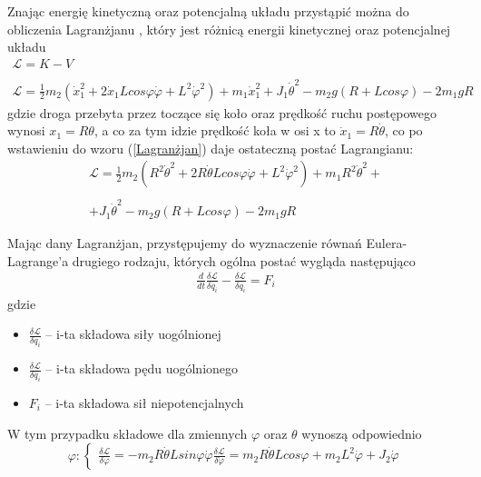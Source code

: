 Znając energię kinetyczną oraz potencjalną układu przystąpić można do obliczenia Lagranżjanu \cite{ManipulatoryiRoboty}, który jest różnicą energii kinetycznej oraz potencjalnej układu
\begin{equation}
    \begin{array}{cl}
    \mathcal{L} = K - V \\ \\ 
    \mathcal{L} = \frac{1}{2}m_2(\dot{x}_1^2 + 2\dot{x}_1Lcos\varphi\dot{\varphi} + L^2\dot{\varphi}^2) + m_1\dot{x}_1^2 + J_1\dot{\theta}^2 - m_2g(R + Lcos\varphi) - 2m_1gR
    \label{Lagranżjan}
    \end{array}
\end{equation}
gdzie droga przebyta przez toczące się koło oraz prędkość ruchu postępowego wynosi $x_1 = R\theta$, a co za tym idzie prędkość koła w osi x to $\dot{x}_1 = R\dot{\theta}$, co po wstawieniu do wzoru (\ref{Lagranżjan}) daje ostateczną postać Lagrangianu:
\begin{equation}
    \begin{array}{ll}
    \mathcal{L} = \frac{1}{2}m_2(R^2\dot{\theta}^2 + 2R\dot{\theta}Lcos\varphi\dot{\varphi} + L^2\dot{\varphi}^2) + m_1R^2\dot{\theta}^2 + \\ \\
    + J_1\dot{\theta}^2 - m_2g(R + Lcos\varphi) - 2m_1gR
    \end{array}
\end{equation}

Mając dany Lagranżjan, przystępujemy do wyznaczenie równań Eulera-Lagrange'a drugiego rodzaju, których ogólna postać wygląda następująco
$$
    \begin{array}{ll}
    \frac{d}{dt}\frac{\delta\mathcal{L}}{\delta\dot{q_i}} - \frac{\delta\mathcal{L}}{\delta q_i} = F_i
    \end{array}
$$
gdzie
\begin{itemize}
    \item $\frac{\delta\mathcal{L}}{\delta q_i}$ -- i-ta składowa siły uogólnionej
    \item $\frac{\delta\mathcal{L}}{\delta\dot{q_i}}$ -- i-ta składowa pędu uogólnionego
    \item $F_i$ -- i-ta składowa sił niepotencjalnych
\end{itemize}

W tym przypadku składowe dla zmiennych $\varphi$ oraz $\theta$ wynoszą odpowiednio
$$
    \varphi:
    \left\{
    \begin{array}{ll}
    \frac{\delta\mathcal{L}}{\delta\varphi} = -m_2R\dot{\theta}Lsin\varphi\dot{\varphi}
    \frac{\delta\mathcal{L}}{\delta\dot{\varphi}} = m_2R\dot{\theta}Lcos\varphi + m_2L^2\dot{\varphi} + J_2\dot{\varphi}
    \end{array}
    \right.
$$


